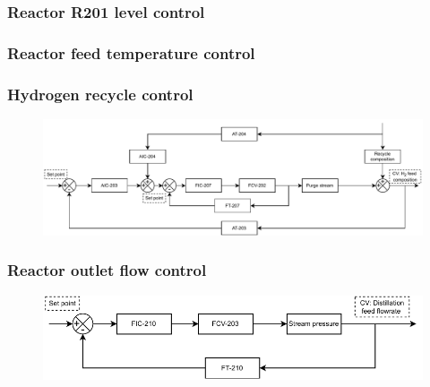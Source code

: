 \subsubsection{Reactor R201 level control}

\subsubsection{Reactor feed temperature control}

\subsubsection{Hydrogen recycle control}
\begin{figure}[H]
    \centering
    \includegraphics[width=\linewidth]{chapters/4-operation-control/4-Figures/V202-CC.pdf}
    \caption{}
    \label{fig:V202-CC}
\end{figure}

\subsubsection{Reactor outlet flow control}
\begin{figure}[H]
    \centering
    \includegraphics[width=\linewidth]{chapters/4-operation-control/4-Figures/V201-FC.pdf}
    \caption{}
    \label{fig:V201-FC}
\end{figure}


